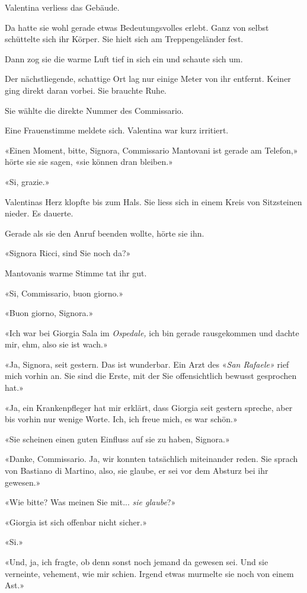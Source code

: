 Valentina verliess das Gebäude.

Da hatte sie wohl gerade etwas Bedeutungsvolles erlebt. Ganz von selbst
schüttelte sich ihr Körper. Sie hielt sich am Treppengeländer fest.

Dann zog sie die warme Luft tief in sich ein und schaute sich um.

Der nächstliegende, schattige Ort lag nur einige Meter von ihr entfernt.
Keiner ging direkt daran vorbei. Sie brauchte Ruhe.

Sie wählte die direkte Nummer des Commissario.

Eine Frauenstimme meldete sich. Valentina war kurz irritiert.

«Einen Moment, bitte, Signora, Commissario Mantovani ist gerade am
Telefon,» hörte sie sie sagen, «sie können dran bleiben.»

«Si, grazie.»

Valentinas Herz klopfte bis zum Hals. Sie liess sich in einem Kreis von
Sitzsteinen nieder. Es dauerte.

Gerade als sie den Anruf beenden wollte, hörte sie ihn.

«Signora Ricci, sind Sie noch da?»

Mantovanis warme Stimme tat ihr gut.

«Si, Commissario, buon giorno.»

«Buon giorno, Signora.»

«Ich war bei Giorgia Sala im \emph{Ospedale,} ich bin gerade
rausgekommen und dachte mir, ehm, also sie ist wach.»

«Ja, Signora, seit gestern. Das ist wunderbar. Ein Arzt des «\emph{San
Rafaele»} rief mich vorhin an. Sie sind die Erste, mit der Sie
offensichtlich bewusst gesprochen hat.»

«Ja, ein Krankenpfleger hat mir erklärt, dass Giorgia seit gestern
spreche, aber bis vorhin nur wenige Worte. Ich, ich freue mich, es war
schön.»

«Sie scheinen einen guten Einfluss auf sie zu haben, Signora.»

«Danke, Commissario. Ja, wir konnten tatsächlich miteinander reden. Sie
sprach von Bastiano di Martino, also, sie glaube, er sei vor dem Absturz
bei ihr gewesen.»

«Wie bitte? Was meinen Sie mit... \emph{sie glaube}?»

«Giorgia ist sich offenbar nicht sicher.»

«Si.»

«Und, ja, ich fragte, ob denn sonst noch jemand da gewesen sei. Und sie
verneinte, vehement, wie mir schien. Irgend etwas murmelte sie noch von
einem Ast.»

